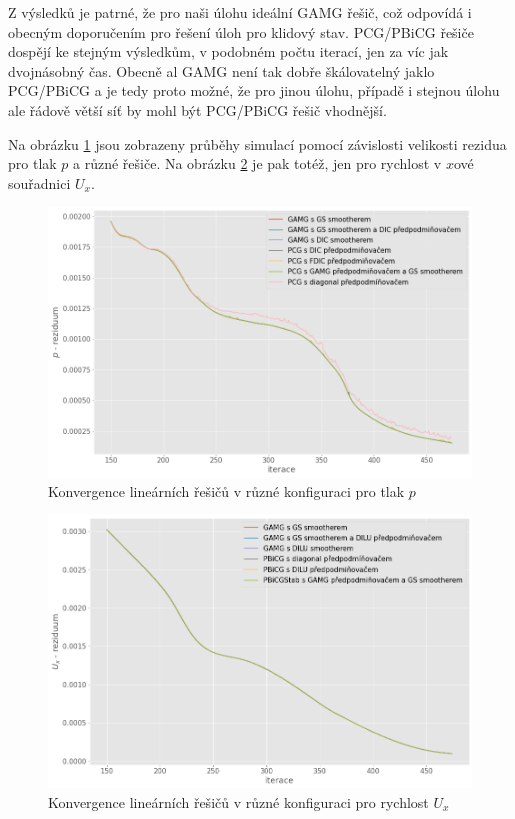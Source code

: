 \documentclass[a4paper,12pt]{report}
\theoremstyle{remark}
\begin{document}
Z výsledků je patrné, že pro naši úlohu ideální GAMG řešič, což odpovídá i obecným doporučením pro řešení úloh pro klidový stav. PCG/PBiCG řešiče dospějí ke stejným výsledkům, v podobném počtu iterací, jen za víc jak dvojnásobný čas. Obecně al GAMG není tak dobře škálovatelný jaklo PCG/PBiCG a je tedy proto možné, že pro jinou úlohu, případě i stejnou úlohu ale řádově větší síť by mohl být PCG/PBiCG řešič vhodnější.

Na obrázku \ref{fig:p-residuum} jsou zobrazeny průběhy simulací pomocí závislosti velikosti rezidua pro tlak $p$ a různé řešiče. Na obrázku \ref{fig:ux-residuum} je pak totéž, jen pro rychlost v $x$ové souřadnici $U_x$.


\begin{figure}[H]
	\centering
	\includegraphics[width=1\linewidth]{p-residuum.png}
	\caption{Konvergence lineárních řešičů v různé konfiguraci pro tlak $p$}
	\label{fig:p-residuum}
\end{figure}


\begin{figure}[H]
	\centering
	\includegraphics[width=1\linewidth]{ux-residuum.png}
	\caption{Konvergence lineárních řešičů v různé konfiguraci pro rychlost $U_x$}
	\label{fig:ux-residuum}
\end{figure}
\end{document}
